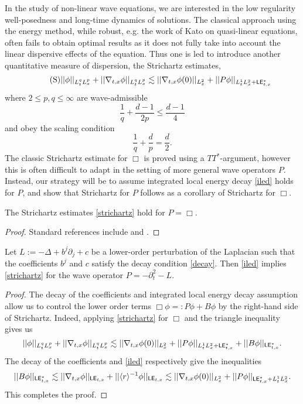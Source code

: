 In the study of non-linear wave equations, we are interested in the low regularity well-posedness and long-time dynamics of solutions. The classical approach using the energy method, while robust, e.g. the work of Kato \cite{Kato1975} on quasi-linear equations, often fails to obtain optimal results as it does not fully take into account the linear dispersive effects of the equation. Thus one is led to introduce another quantitative measure of dispersion, the Strichartz estimates,
	\begin{equation}\tag{S}\label{eq:strichartz}
		||\phi||_{L^q_t L^p_x} + ||\nabla_{t, x}\phi||_{L^q_t L^p_x}  \lesssim ||\nabla_{t, x} \phi(0)||_{L^2_x} + ||P \phi||_{L^1_t L^2_x + \mathsf{LE}^*_{t, x}}
	\end{equation}
where $2 \leq p, q \leq \infty$ are wave-admissible
	\[
		\frac1q + \frac{d - 1}{2p} \leq \frac{d - 1}{4}
	\]	
and obey the scaling condition 
	\[
		\frac1q + \frac{d}{p} = \frac{d}{2}.
	\]	
The classic Strichartz estimate for $\Box$ is proved using a $TT^*$-argument, however this is often difficult to adapt in the setting of more general wave operators $P$. Instead, our strategy will be to assume integrated local energy decay \eqref{iled} holds for $P$, and show that Strichartz for $P$ follows as a corollary of Strichartz for $\Box$. 
	
\begin{lemma}
	The Strichartz estimates \eqref{strichartz} hold for $P = \Box$. 
\end{lemma}
	
\begin{proof}
	Standard references include \cite{ShatahStruwe2000} and \cite{Sogge1995}. 
\end{proof}	
	
\begin{theorem}
	Let $L := - \Delta + b^j \partial_j + c$ be a lower-order perturbation of the Laplacian such that the coefficients $b^j$ and $c$ satisfy the decay condition \eqref{decay}. Then \eqref{iled} implies \eqref{strichartz} for the wave operator $P = - \partial_t^2 - L$. 
\end{theorem}	

\begin{proof}
	The decay of the coefficients and integrated local energy decay assumption allow us to control the lower order terms $\Box \phi =: P\phi + B\phi$ by the right-hand side of Strichartz. Indeed, applying \eqref{strichartz} for $\Box$ and the triangle inequality gives us 
		\[
			||\phi||_{L^q_t L^p_x} + ||\nabla_{t, x}\phi||_{L^q_t L^p_x}  \lesssim ||\nabla_{t, x}\phi(0)||_{L^2_x} + ||P \phi||_{L^1_t L^2_x + \mathsf{LE}^*_{t, x}} +  ||B \phi||_{\mathsf{LE}^*_{t, x}}.
		\]
	The decay of the coefficients and \eqref{iled} respectively give the inequalities 
		\[
			||B\phi||_{\mathsf{LE}^*_{t, x}} \lesssim ||\nabla_{t, x} \phi ||_{\mathsf{LE}_{t, x}} + ||\langle r \rangle^{-1} \phi||_{\mathsf{LE}_{t, x}} \lesssim ||\nabla_{t, x} \phi(0)||_{L^2_x} + ||P\phi||_{\mathsf{LE}^*_{t, x} + L^1_t L^2_x}.
		\]	
	This completes the proof. 
\end{proof}

